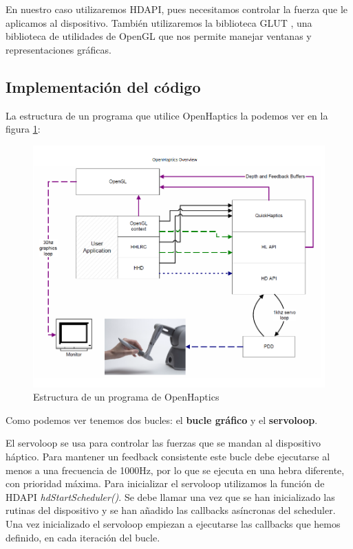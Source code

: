 \documentclass[a4paper,11pt, oneside]{book}
\begin{document}
En nuestro caso utilizaremos HDAPI, pues necesitamos controlar la fuerza que le aplicamos al dispositivo. También utilizaremos la biblioteca GLUT \cite{glut}, una biblioteca de utilidades de OpenGL que nos permite manejar ventanas y representaciones gráficas.

\subsection{Implementación del código}

La estructura de un programa que utilice OpenHaptics la podemos ver en la figura \ref{fig:oh-estructura}: 

\begin{figure}[H]
	
	\centering
	\includegraphics[width=\linewidth]{estructura}
	\caption{Estructura de un programa de OpenHaptics \cite{guide}}
	\label{fig:oh-estructura}
	
\end{figure}


Como podemos ver tenemos dos bucles: el \textbf{bucle gráfico} y el \textbf{servoloop}.

El servoloop se usa para controlar las fuerzas que se mandan al dispositivo háptico. Para mantener un feedback consistente este bucle debe ejecutarse al menos a una frecuencia de 1000Hz, por lo que se ejecuta en una hebra diferente, con prioridad máxima. Para inicializar el servoloop utilizamos la función de HDAPI \textit{hdStartScheduler()}. Se debe llamar una vez que se han inicializado las rutinas del dispositivo y se han añadido las callbacks asíncronas del scheduler. Una vez inicializado el servoloop empiezan a ejecutarse las callbacks que hemos definido, en cada iteración del bucle.
\end{document}
